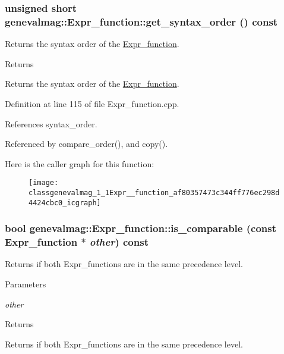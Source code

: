 \hypertarget{classgenevalmag_1_1Expr__function_af80357473c344ff776ec298d4424cbc0}{
\subsubsection[{get\_\-syntax\_\-order}]{\setlength{\rightskip}{0pt plus 5cm}unsigned short genevalmag::Expr\_\-function::get\_\-syntax\_\-order () const}}
\label{classgenevalmag_1_1Expr__function_af80357473c344ff776ec298d4424cbc0}
Returns the syntax order of the \hyperlink{classgenevalmag_1_1Expr__function}{Expr\_\-function}. \begin{DoxyReturn}{Returns}

\end{DoxyReturn}
Returns the syntax order of the \hyperlink{classgenevalmag_1_1Expr__function}{Expr\_\-function}. 

Definition at line 115 of file Expr\_\-function.cpp.



References syntax\_\-order.



Referenced by compare\_\-order(), and copy().



Here is the caller graph for this function:\nopagebreak
\begin{figure}[H]
\begin{center}
\leavevmode
\texttt{[image: classgenevalmag\_1\_1Expr\_\_function\_af80357473c344ff776ec298d4424cbc0\_icgraph]}
\end{center}
\end{figure}


\hypertarget{classgenevalmag_1_1Expr__function_a24aaf520c742fde5eff5c8c596549009}{
\subsubsection[{is\_\-comparable}]{\setlength{\rightskip}{0pt plus 5cm}bool genevalmag::Expr\_\-function::is\_\-comparable (const {\bf Expr\_\-function} $\ast$ {\em other}) const}}
\label{classgenevalmag_1_1Expr__function_a24aaf520c742fde5eff5c8c596549009}
Returns if both Expr\_\-functions are in the same precedence level. 
\begin{DoxyParams}{Parameters}
\item[{\em other}]\end{DoxyParams}
\begin{DoxyReturn}{Returns}

\end{DoxyReturn}
Returns if both Expr\_\-functions are in the same precedence level. 


